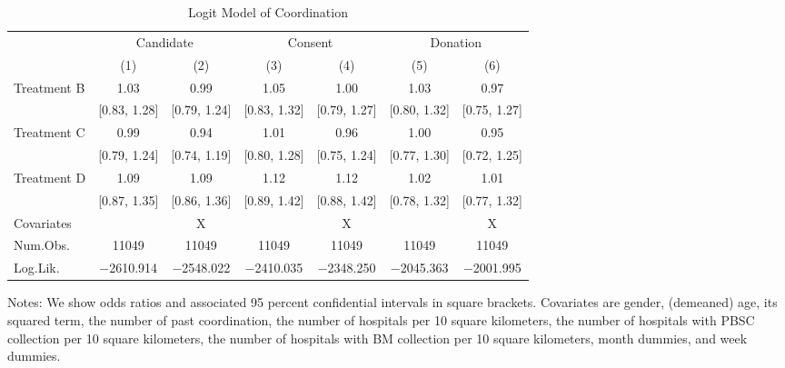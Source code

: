 \documentclass[12pt, a4paper]{article}
\begin{document}
\begin{table}[H]

\caption{\label{tab:coordinate-logit}Logit Model of Coordination}
\centering
\fontsize{9}{11}\selectfont
\begin{threeparttable}
\begin{tabular}[t]{lcccccc}
\toprule
\multicolumn{1}{c}{ } & \multicolumn{2}{c}{Candidate} & \multicolumn{2}{c}{Consent} & \multicolumn{2}{c}{Donation} \\
\cmidrule(l{3pt}r{3pt}){2-3} \cmidrule(l{3pt}r{3pt}){4-5} \cmidrule(l{3pt}r{3pt}){6-7}
  & (1) & (2) & (3) & (4) & (5) & (6)\\
\midrule
Treatment B & \num{1.03} & \num{0.99} & \num{1.05} & \num{1.00} & \num{1.03} & \num{0.97}\\
 & {}[\num{0.83}, \num{1.28}] & {}[\num{0.79}, \num{1.24}] & {}[\num{0.83}, \num{1.32}] & {}[\num{0.79}, \num{1.27}] & {}[\num{0.80}, \num{1.32}] & {}[\num{0.75}, \num{1.27}]\\
Treatment C & \num{0.99} & \num{0.94} & \num{1.01} & \num{0.96} & \num{1.00} & \num{0.95}\\
 & {}[\num{0.79}, \num{1.24}] & {}[\num{0.74}, \num{1.19}] & {}[\num{0.80}, \num{1.28}] & {}[\num{0.75}, \num{1.24}] & {}[\num{0.77}, \num{1.30}] & {}[\num{0.72}, \num{1.25}]\\
Treatment D & \num{1.09} & \num{1.09} & \num{1.12} & \num{1.12} & \num{1.02} & \num{1.01}\\
 & {}[\num{0.87}, \num{1.35}] & {}[\num{0.86}, \num{1.36}] & {}[\num{0.89}, \num{1.42}] & {}[\num{0.88}, \num{1.42}] & {}[\num{0.78}, \num{1.32}] & {}[\num{0.77}, \num{1.32}]\\
\midrule
Covariates &  & X &  & X &  & X\\
Num.Obs. & \num{11049} & \num{11049} & \num{11049} & \num{11049} & \num{11049} & \num{11049}\\
Log.Lik. & \num{-2610.914} & \num{-2548.022} & \num{-2410.035} & \num{-2348.250} & \num{-2045.363} & \num{-2001.995}\\
\bottomrule
\end{tabular}
\begin{tablenotes}
\item Notes: We show odds ratios and associated 95 percent confidential intervals in square brackets. Covariates are gender, (demeaned) age, its squared term, the number of past coordination, the number of hospitals per 10 square kilometers, the number of hospitals with PBSC collection per 10 square kilometers, the number of hospitals with BM collection per 10 square kilometers, month dummies, and week dummies.
\end{tablenotes}
\end{threeparttable}
\end{table}
\end{document}
